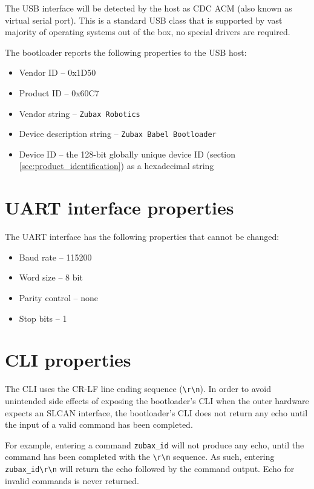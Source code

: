 \documentclass{zubaxdoc}
\begin{document}
The USB interface will be detected by the host as CDC ACM (also known as virtual serial port).
This is a standard USB class that is supported by vast majority of operating systems out of the box,
no special drivers are required.

The bootloader reports the following properties to the USB host:
\begin{itemize}
    \item Vendor ID -- 0x1D50
    \item Product ID -- 0x60C7
    \item Vendor string -- \verb|Zubax Robotics|
    \item Device description string -- \verb|Zubax Babel Bootloader|
    \item Device ID -- the 128-bit globally unique device ID (section \ref{sec:product_identification})
                       as a hexadecimal string
\end{itemize}

\section{UART interface properties}

The UART interface has the following properties that cannot be changed:
\begin{itemize}
    \item Baud rate -- 115200
    \item Word size -- 8 bit
    \item Parity control -- none
    \item Stop bits -- 1
\end{itemize}

\section{CLI properties}

The CLI uses the CR-LF line ending sequence (\verb|\r\n|).
In order to avoid unintended side effects of exposing the bootloader's CLI when the
outer hardware expects an SLCAN interface,
the bootloader's CLI does not return any echo until the input of a valid command has been completed.

For example, entering a command \verb|zubax_id| will not produce any echo, until the command has been completed
with the \verb|\r\n| sequence.
As such, entering \verb|zubax_id\r\n| will return the echo followed by the command output.
Echo for invalid commands is never returned.
\end{document}
